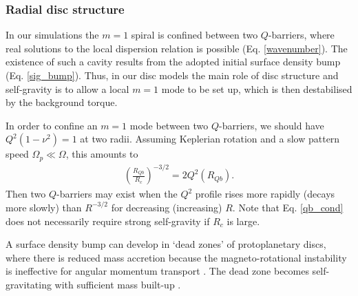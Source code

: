{  %

  
     
 
  \subsubsection{Radial disc structure}
  In our simulations the 
  $m=1$ spiral is confined between two $Q$-barriers, where real solutions to the local
  dispersion relation is possible (Eq. \ref{wavenumber}). The
  existence of such a cavity results from the adopted initial surface
  density bump (Eq. \ref{sig_bump}).  
  Thus, in our disc models the main role of disc structure 
  and self-gravity is to allow a local $m=1$ mode to be set up, which is then 
  destabilised by the background torque. 
  
  In order to confine an $m=1$ mode between two $Q$-barriers, we
  should have $Q^2(1-\nu^2)=1$ at two radii. Assuming 
  Keplerian rotation and a slow pattern speed $\Omega_p\ll\Omega$,
  this amounts to 
  \begin{align}\label{qb_cond}
    \left(\frac{R_{Qb}}{R_c}\right)^{-3/2} = 2Q^2(R_{Qb}). 
  \end{align}
  Then two $Q$-barriers may exist when the $Q^2$ profile
  rises more rapidly (decays more slowly) than $R^{-3/2}$
  for decreasing (increasing) $R$. Note that 
  Eq. \ref{qb_cond} does not necessarily require strong self-gravity
  if $R_c$ is large. 
  
  A surface density bump can develop in 
  `dead zones' of protoplanetary 
  discs, where there is reduced mass accretion because the magneto-rotational 
  instability is ineffective for angular momentum transport 
  \citep{gammie96,turner08,landry13}. The dead zone becomes 
  self-gravitating with sufficient mass built-up 
  \citep{armitage01,martin12,martin12b,zhu09,zhu10,zhu10b,bae13}.  
  
}
